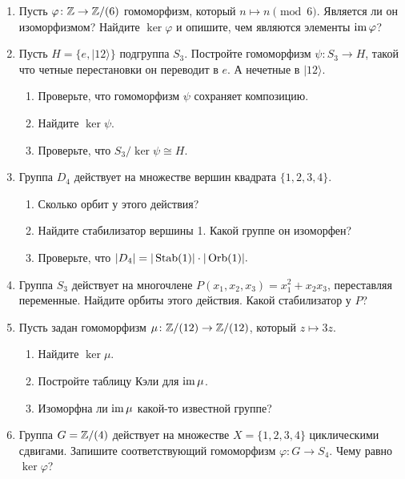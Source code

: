 \begin{enumerate}
    \item Пусть $\varphi \colon \mathbb Z \to \mathbb Z/(6)$ гомоморфизм, который $n \mapsto n \pmod 6.$
            Является ли он изоморфизмом? Найдите $\ker \varphi$ и опишите, 
            чем являются элементы $\operatorname{im} \varphi$?
    \item Пусть $H = \{e, |1 2\rangle \}$ подгруппа $S_3$. Постройте гомоморфизм
         $\psi \colon S_3 \to H$, такой что четные перестановки он переводит в  $e.$
         А нечетные в $|1 2 \rangle$. 
         \begin{enumerate}
             \item Проверьте, что гомоморфизм $\psi$ сохраняет композицию.
             \item Найдите $\ker \psi$.
             \item Проверьте, что $S_3/\ker\psi \cong H$.
         \end{enumerate}
     \item Группа $D_4$ действует на множестве вершин квадрата $\{1, 2, 3, 4\}$.
         \begin{enumerate}
             \item Сколько орбит у этого действия?
             \item Найдите стабилизатор вершины 1. Какой группе он изоморфен?
             \item Проверьте, что \(
             |D_4| = |\operatorname{Stab}(1)| \cdot |\operatorname{Orb}(1)|
             .\)
         \end{enumerate}
     \item Группа $S_3$ действует на многочлене $P(x_1, x_2, x_3) = x_1^2 + x_2x_3$,
         переставляя переменные. Найдите орбиты этого действия. Какой стабилизатор у $P$?
     \item Пусть задан гомоморфизм $\mu \colon \mathbb Z/(12) \to \mathbb Z/(12)$, который $z \mapsto 3z$.
         \begin{enumerate}
             \item Найдите $\ker \mu$.
             \item Постройте таблицу Кэли для $\operatorname{im} \mu$.
             \item Изоморфна ли $\operatorname{im} \mu$ какой-то известной группе?
         \end{enumerate}
     \item Группа $G = \mathbb Z / (4)$ действует на множестве $X = \{1, 2, 3, 4\}$ 
         циклическими сдвигами. Запишите соответствующий гомоморфизм $\varphi \colon G \to S_4$.
         Чему равно $\ker \varphi$?

\end{enumerate}
